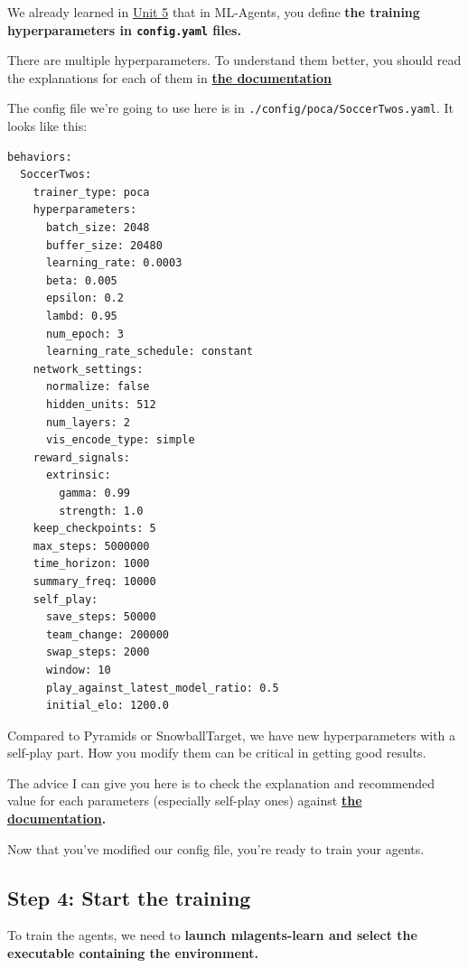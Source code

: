 \documentclass[11pt,a4paper]{article}
\begin{document}
We already learned in \href{https://huggingface.co/deep-rl-course/unit5/introduction}{Unit 5} that in ML-Agents, you define \textbf{the training hyperparameters in \texttt{config.yaml} files.}

There are multiple hyperparameters. To understand them better, you should read the explanations for each of them in \textbf{\href{https://github.com/Unity-Technologies/ml-agents/blob/release_20_docs/docs/Training-Configuration-File.md}{the documentation}}

The config file we're going to use here is in \texttt{./config/poca/SoccerTwos.yaml}. It looks like this:

\begin{lstlisting}
behaviors:
  SoccerTwos:
    trainer_type: poca
    hyperparameters:
      batch_size: 2048
      buffer_size: 20480
      learning_rate: 0.0003
      beta: 0.005
      epsilon: 0.2
      lambd: 0.95
      num_epoch: 3
      learning_rate_schedule: constant
    network_settings:
      normalize: false
      hidden_units: 512
      num_layers: 2
      vis_encode_type: simple
    reward_signals:
      extrinsic:
        gamma: 0.99
        strength: 1.0
    keep_checkpoints: 5
    max_steps: 5000000
    time_horizon: 1000
    summary_freq: 10000
    self_play:
      save_steps: 50000
      team_change: 200000
      swap_steps: 2000
      window: 10
      play_against_latest_model_ratio: 0.5
      initial_elo: 1200.0
\end{lstlisting}

Compared to Pyramids or SnowballTarget, we have new hyperparameters with a self-play part. How you modify them can be critical in getting good results.

The advice I can give you here is to check the explanation and recommended value for each parameters (especially self-play ones) against \textbf{\href{https://github.com/Unity-Technologies/ml-agents/blob/release_20_docs/docs/Training-Configuration-File.md}{the documentation}.}

Now that you've modified our config file, you're ready to train your agents.

\subsection{Step 4: Start the training}\label{step-4-start-the-training}

To train the agents, we need to \textbf{launch mlagents-learn and select the executable containing the environment.}
\end{document}
